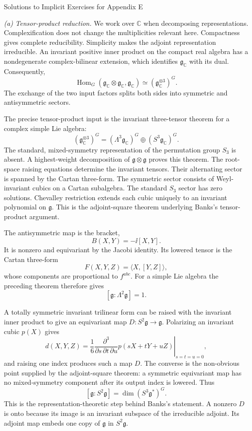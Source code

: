 \begin{bankssolutions}{Solutions to Implicit Exercises for Appendix E}

\textit{(a) Tensor-product reduction.}
We work over $\mathbb C$ when decomposing representations.  Complexification
does not change the multiplicities relevant here.  Compactness gives complete
reducibility.  Simplicity makes the adjoint representation irreducible.
An invariant positive inner product on the compact real algebra has a
nondegenerate complex-bilinear extension, which identifies
$\mathfrak g_{\mathbb C}$ with its dual.  Consequently,
\[
  \operatorname{Hom}_G(\mathfrak g_{\mathbb C}\otimes
  \mathfrak g_{\mathbb C},\mathfrak g_{\mathbb C})
  \simeq (\mathfrak g_{\mathbb C}^{\otimes3})^G.
  \tag{E.1}
\]
The exchange of the two input factors splits both sides into symmetric and
antisymmetric sectors.

The precise tensor-product input is the invariant three-tensor theorem for a
complex simple Lie algebra:
\[
  (\mathfrak g_{\mathbb C}^{\otimes3})^G
  =(\Lambda^3\mathfrak g_{\mathbb C})^G
   \oplus(S^3\mathfrak g_{\mathbb C})^G.
\]
The standard, mixed-symmetry representation of the permutation group $S_3$
is absent.  A highest-weight decomposition of
$\mathfrak g\otimes\mathfrak g$ proves this theorem.  The root-space raising
equations determine the invariant tensors.  Their alternating sector is
spanned by the Cartan three-form.  The symmetric sector consists of
Weyl-invariant cubics on a Cartan subalgebra.  The standard $S_3$ sector has
zero solutions.  Chevalley restriction extends each cubic uniquely to an
invariant polynomial on $\mathfrak g$.  This is the adjoint-square theorem
underlying Banks's tensor-product argument.

The antisymmetric map is the bracket,
\[
  B(X,Y)=-\ii[X,Y].
\]
It is nonzero and equivariant by the Jacobi identity.  Its lowered tensor is
the Cartan three-form
\[
  F(X,Y,Z)=\langle X,[Y,Z]\rangle,
\]
whose components are proportional to $f^{abc}$.  For a simple Lie algebra the
preceding theorem therefore gives
\[
  [\mathfrak g:\Lambda^2\mathfrak g]=1.
  \tag{E.2}
\]

A totally symmetric invariant trilinear form can be raised with the invariant
inner product to give an equivariant map
$D:S^2\mathfrak g\to\mathfrak g$.  Polarizing an invariant cubic $p(X)$ gives
\[
  d(X,Y,Z)=\frac{1}{6}
  \left.\frac{\partial^3}{\partial s\,\partial t\,\partial u}
  p(sX+tY+uZ)\right|_{s=t=u=0},
  \tag{E.3}
\]
and raising one index produces such a map $D$.  The converse is the
non-obvious point supplied by the adjoint-square theorem: a symmetric
equivariant map has no mixed-symmetry component after its output index is
lowered.  Thus
\[
  [\mathfrak g:S^2\mathfrak g]
  =\dim(S^3\mathfrak g^*)^G.
  \tag{E.4}
\]
This is the representation-theoretic step behind Banks's statement.  A
nonzero $D$ is onto because its image is an invariant subspace of the
irreducible adjoint.  Its adjoint map embeds one copy of $\mathfrak g$ in
$S^2\mathfrak g$.


\end{bankssolutions}
